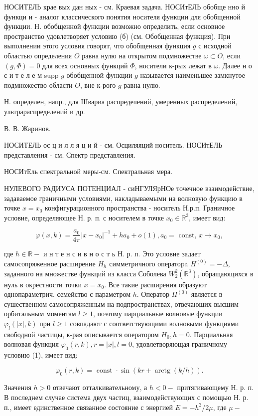 \documentclass[10pt]{article}
\begin{document}
НОСИТЕЛЬ крае вых дан ных - см. Краевая задача. НОСИтЕЛЬ обобще нно й функци и - аналог классического понятия носителя функции для обобщенной функции. Н. обобщенной функции возможно определить, если основное пространство удовлетворяет условию (б) (см. Обобщенная функция). При выполнении этого условия говорят, что обобщенная функция $g$ с исходной областью определения $O$ равна нулю на открытом подмножестве $\omega \subset O$, если $(g, \Phi)=0$ для всех основных функций $\Phi$, носители к-рых лежат в $\omega$. Далее н о с и т е л е м supp $g$ обобщенной функции $g$ называется наименьшее замкнутое подмножество области $O$, вне к-рого $g$ равна нулю.



Н. определен, напр., для Швариа распределений, умеренных распределений, ультрараспределений и др.



В. В. Жаринов.



НОСИТЕЛЬ ос ц и л л я ц и й - см. Осциляяций носитель. НОСИтЕЛЬ представления - см. Спектр представления.



НОСИтЕль спектральной меры-см. Спектральная мера.



НУЛЕВОГО РАДИУСА ПОТЕНЦИАЛ - сиНГУЛЯрНОе точечное взаимодействие, задаваемое граничными условиями, накладываемыми на волновую функцию в точке $x=x_{0}$ конфигурационного пространства - носитель Н.р.п. Граничное условие, определяющее Н. р. п. с носителем в точке $x_{0} \in \mathbb{R}^{3}$, имеет вид:



\[

\varphi(x, k)=\frac{a_{0}}{4 \pi}\left|x-x_{0}\right|^{-1}+h a_{0}+o(1), a_{0}=\text { const, } x \rightarrow x_{0},

\]



где $h \in \mathbb{R}-$ и н т е н с и в н о с т ь Н. р. п. Это условие задает самосопряженное расширение $H_{h}$ симметричного оператоpa $H^{(0)}=-\Delta$, заданного на множестве функций из класса Соболева $W_{2}^{2}\left(\mathbb{R}^{3}\right)$, обращающихся в нуль в окрестности точки $x=x_{0}$. Все такие расширения образуют однопараметрич. семейство с параметром $h$. Оператор $H^{(0)}$ является в сушественном самосопряженным на подпространствах, отвечающих высшим орбитальным моментам $l \geqslant 1$, поэтому парциальные волновые функции $\varphi_{l}(|x|, k)$ при $l \geqslant 1$ совпадают с соответствующими волновыми функциями свободной частицы, к-рая описывается оператором $H_{0}, h=0$. Парциальная волновая функция $\varphi_{0}(r, k), r=|x|, l=0$, удовлетворяющая граничному условию (1), имеет вид:



\[

\varphi_{0}(r, k)=\text { const } \cdot \sin (k r+\operatorname{arctg}(k / h)) .

\]



Значения $h>0$ отвечают отталкивательному, а $h<0-$ притягивающему Н. р. п. В последнем случае система двух частиц, взаимодействующих с помощью Н. р. п., имеет единственное связанное состояние с энергией $E=-h^{2} / 2 \mu$, где $\mu-$
\end{document}
